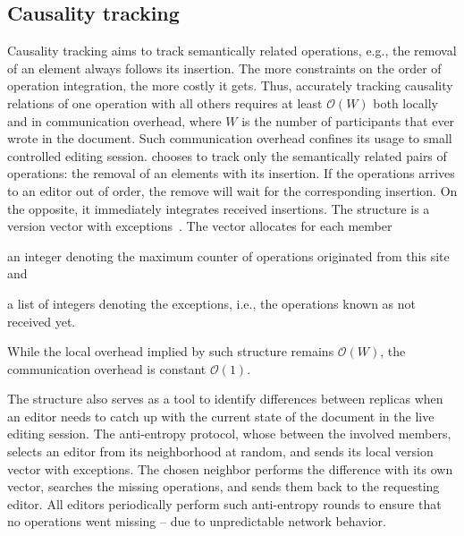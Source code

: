 

\subsection{Causality tracking}
\label{subsec:causality}

Causality tracking aims to track semantically related operations, e.g., the
removal of an element always follows its insertion. The more constraints on the
order of operation integration, the more costly it gets. Thus, accurately
tracking causality relations of one operation with all others requires at least
$\mathcal{O}(W)$ both locally and in communication overhead, where $W$ is the
number of participants that ever wrote in the document. Such communication
overhead confines its usage to small controlled editing session. \CRATE chooses
to track only the semantically related pairs of operations: the removal of an
elements with its insertion. If the operations arrives to an editor out of
order, the remove will wait for the corresponding insertion. On the opposite, it
immediately integrates received insertions. The structure is a version vector
with exceptions~\cite{malkhi2007concise, mukund2014optimized}. The vector
allocates for each member
\begin{inparaenum}[(i)]
\item an integer denoting the maximum counter of operations originated from
  this site and
\item a list of integers denoting the exceptions, i.e., the operations known
  as not received yet.
\end{inparaenum}
While the local overhead implied by such structure remains $\mathcal{O}(W)$, the
communication overhead is constant $\mathcal{O}(1)$.

The structure also serves as a tool to identify differences between replicas
when an editor needs to catch up with the current state of the document in the
live editing session. The anti-entropy protocol, whose  between the
involved members, selects an editor from its neighborhood at random, and sends
its local version vector with exceptions. The chosen neighbor performs the
difference with its own vector, searches the missing operations, and sends them
back to the requesting editor. All editors periodically perform such
anti-entropy rounds to ensure that no operations went missing -- due to
unpredictable network behavior.

